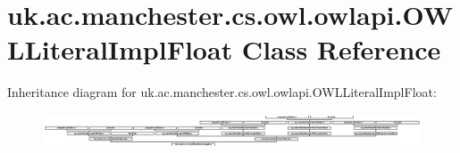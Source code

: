 \hypertarget{classuk_1_1ac_1_1manchester_1_1cs_1_1owl_1_1owlapi_1_1_o_w_l_literal_impl_float}{\section{uk.\-ac.\-manchester.\-cs.\-owl.\-owlapi.\-O\-W\-L\-Literal\-Impl\-Float Class Reference}
\label{classuk_1_1ac_1_1manchester_1_1cs_1_1owl_1_1owlapi_1_1_o_w_l_literal_impl_float}
}
Inheritance diagram for uk.\-ac.\-manchester.\-cs.\-owl.\-owlapi.\-O\-W\-L\-Literal\-Impl\-Float\-:\begin{figure}[H]
\begin{center}
\leavevmode
\includegraphics[height=1.028466cm]{classuk_1_1ac_1_1manchester_1_1cs_1_1owl_1_1owlapi_1_1_o_w_l_literal_impl_float}
\end{center}
\end{figure}
